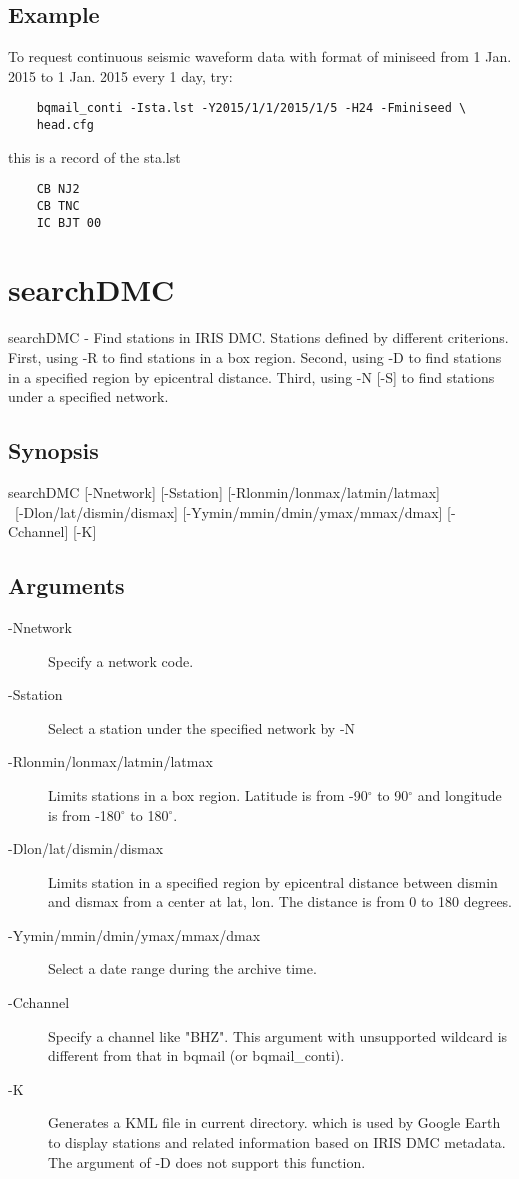 \documentclass[12pt, a4paper]{report}
\begin{document}
\subsection{Example}
To request continuous seismic waveform data with format of miniseed from 1 Jan. 2015 to 1 Jan. 2015 every 1 day, try:
\begin{lstlisting}
	bqmail_conti -Ista.lst -Y2015/1/1/2015/1/5 -H24 -Fminiseed \
	head.cfg
\end{lstlisting}
this is a record of the {\ti sta.lst}
\begin{lstlisting}
	CB NJ2
	CB TNC
	IC BJT 00
\end{lstlisting}

\section{searchDMC}
searchDMC - Find stations in IRIS DMC. Stations defined by different criterions. First, using {\tb -R} to find stations in a box region. Second, using {\tb -D} to find stations in a specified region by epicentral distance. Third, using {\tb -N [-S]} to find stations under a specified network.
\subsection{Synopsis}
{\tb searchDMC} [{\tb -N}{\ti network}] [{\tb -S}{\ti station}] [{\tb -R}{\ti lonmin/lonmax/latmin/latmax}] \\\
[{\tb -D}{\ti lon/lat/dismin/dismax}] [{\tb -Y}{\ti ymin/mmin/dmin/ymax/mmax/dmax}] [{\tb -C}{\ti channel}] [{\tb -K}]
\subsection{Arguments}
\begin{description}
\item[{\tb -N}{\ti network}] Specify a network code.
\item[{\tb -S}{\ti station}] Select a station under the specified network by {\tb -N}
\item[{\tb -R}{\ti lonmin/lonmax/latmin/latmax}] Limits stations in a box region. Latitude is from -90$^\circ$ to 90$^\circ$  and longitude is from -180$^\circ$ to 180$^\circ$.
\item[{\tb -D}{\ti lon/lat/dismin/dismax}] Limits station in a specified region by epicentral distance between {\ti dismin} and {\ti dismax} from a center at {\ti lat, lon}. The distance is from 0 to 180 degrees.
\item[{\tb -Y}{\ti ymin/mmin/dmin/ymax/mmax/dmax}] Select a date range during the archive time.
\item[{\tb -C}{\ti channel}] Specify a channel like "{\ti BHZ}". This argument with unsupported wildcard is different from that in {\tb bqmail} (or {\tb bqmail\_conti}).
\item[{\tb -K}] Generates a KML file in current directory. which is used by Google Earth to display stations and related information based on IRIS DMC metadata. The argument of {\tb -D} does not support this function.
\end{description}
\end{document}
